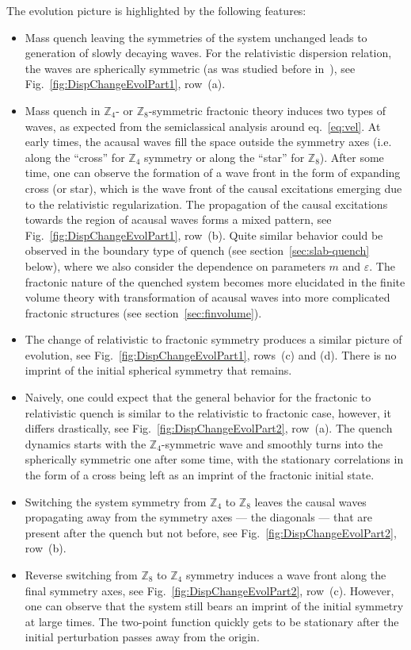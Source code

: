 \documentclass[a4paper,12pt]{article}
\newcommand{\eps}{\varepsilon}
\newcommand{\Z}[1]{\mathbb{Z}_{#1}}
\newcommand{\figref}[1]{Fig.~\ref{#1}}
\newcommand{\secref}[1]{section~\ref{#1}}
\begin{document}
The evolution picture is highlighted by the following features:
\begin{itemize}
    \item Mass quench leaving the symmetries of the system unchanged leads to generation of slowly decaying waves. For the relativistic dispersion relation, the waves are spherically symmetric (as was studied before in~\cite{Calabrese:2007rg, Sotiriadis:2010si}), see \figref{fig:DispChangeEvolPart1}, row~(a).
    
    \item Mass quench in $\Z4$- or $\Z8$-symmetric fractonic theory induces two types of waves, as expected from the semiclassical analysis around eq.~\eqref{eq:vel}. At early times, the acausal waves fill the space outside the symmetry axes (i.e. along the ``cross'' for $\Z4$ symmetry or along the ``star'' for $\Z8$). After some time, one can observe the formation of a wave front in the form of expanding cross (or star), which is the wave front of the causal excitations emerging due to the relativistic regularization. The propagation of the causal excitations towards the region of acausal waves forms a mixed pattern, see \figref{fig:DispChangeEvolPart1}, row~(b). Quite similar behavior could be observed in the boundary type of quench (see \secref{sec:slab-quench} below), where we also consider the dependence on parameters $m$ and $\eps$. The fractonic nature of the quenched system becomes more elucidated in the finite volume theory with transformation of acausal waves into more complicated fractonic structures (see \secref{sec:finvolume}).
    
    \item The change of relativistic to fractonic symmetry produces a similar picture of evolution, see \figref{fig:DispChangeEvolPart1}, rows~(c) and (d). There is no imprint of the initial spherical symmetry that remains.
    
    \item Naively, one could expect that the general behavior for the fractonic to relativistic quench is similar to the relativistic to fractonic case, however, it differs drastically, see \figref{fig:DispChangeEvolPart2}, row~(a). The quench dynamics starts with the $\Z4$-symmetric wave and smoothly turns into the spherically symmetric one after some time, with the stationary correlations in the form of a cross being left as an imprint of the fractonic initial state.

    \item Switching the system symmetry from $\Z4$ to $\Z8$ leaves the causal waves propagating away from the symmetry axes --- the diagonals --- that are present after the quench but not before, see \figref{fig:DispChangeEvolPart2}, row~(b).
    
    \item Reverse switching from $\Z8$ to $\Z4$ symmetry induces a wave front along the final symmetry axes, see \figref{fig:DispChangeEvolPart2}, row~(c). However, one can observe that the system still bears an imprint of the initial symmetry at large times. The two-point function quickly gets to be stationary after the initial perturbation passes away from the origin.
\end{itemize}
\end{document}

